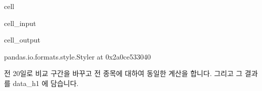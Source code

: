 \documentclass[letterpaper,10pt,english]{jupyterBook}
\begin{document}
\begin{sphinxuseclass}{cell}
\begin{sphinxVerbatimInput}
\begin{sphinxuseclass}{cell_input}
\end{sphinxuseclass}\end{sphinxVerbatimInput}
\begin{sphinxVerbatimOutput}

\begin{sphinxuseclass}{cell_output}
\begin{sphinxVerbatim}[commandchars=\\\{\}]
\PYGZlt{}pandas.io.formats.style.Styler at 0x2a0ce533040\PYGZgt{}
\end{sphinxVerbatim}

\end{sphinxuseclass}\end{sphinxVerbatimOutput}

\end{sphinxuseclass}
\sphinxAtStartPar
 전 20일로 비교 구간을 바꾸고 전 종목에 대하여 동일한 계산을 합니다. 그리고 그 결과를 data\_h1 에 담습니다.
\end{document}
